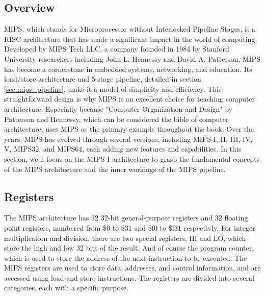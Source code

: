 \subsection{Overview}
MIPS, which stands for Microprocessor without Interlocked Pipeline Stages, is a RISC architecture that has made a significant impact in the world of computing. Developed by MIPS Tech LLC\cite{mipscompany}, a company founded in 1984 by Stanford University researchers including John L. Hennessy and David A. Patterson, MIPS has become a cornerstone in embedded systems, networking, and education. Its load/store architecture and 5-stage pipeline, detailed in section \ref{sec:mips_pipeline}, make it a model of simplicity and efficiency. This straightforward design is why MIPS is an excellent choice for teaching computer architecture. Especially because "Computer Organization and Design" by Patterson and Hennessy\cite{patterson1994computer}, which can be considered the bible of computer architecture, uses MIPS as the primary example throughout the book. Over the years, MIPS has evolved through several versions, including MIPS I, II, III, IV, V, MIPS32, and MIPS64, each adding new features and capabilities. In this section, we'll focus on the MIPS I architecture to grasp the fundamental concepts of the MIPS architecture and the inner workings of the MIPS pipeline.

\subsection{Registers}
The MIPS architecture has 32 32-bit general-purpose registers and 32 floating point registers, numbered from \$0 to \$31 and \$f0 to \$f31 respectivly. For integer multiplication and division, there are two special registers, HI and LO, which store the high and low 32 bits of the result. And of course the program counter, which is used to store the address of the next instruction to be executed. The MIPS registers are used to store data, addresses, and control information, and are accessed using load and store instructions. The registers are divided into several categories, each with a specific purpose.
